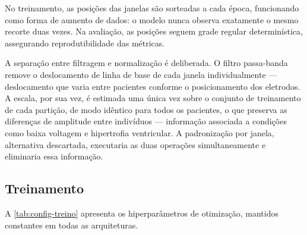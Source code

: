 No treinamento, as posições das janelas são sorteadas a cada época,
funcionando como forma de aumento de dados: o modelo nunca observa
exatamente o mesmo recorte duas vezes. Na avaliação, as posições seguem grade
regular determinística, assegurando reprodutibilidade das métricas.

A separação entre filtragem e normalização é deliberada. O filtro
passa-banda remove o deslocamento de linha de base de cada janela
individualmente --- deslocamento que varia entre pacientes conforme o
posicionamento dos eletrodos. A escala,
por sua vez, é estimada uma única vez sobre o conjunto de treinamento de cada
partição, de modo idêntico para todos os pacientes, o que preserva as
diferenças de amplitude entre indivíduos --- informação associada a condições
como baixa voltagem e hipertrofia ventricular. A padronização por janela,
alternativa descartada, executaria as duas operações simultaneamente e
eliminaria essa informação.

\subsection{Treinamento}
\label{subsec:config-treino}

A \autoref{tab:config-treino} apresenta os hiperparâmetros de otimização,
mantidos constantes em todas as arquiteturas.

\begin{table}[h!]
	\captionsetup{width=14cm}
\end{table}

